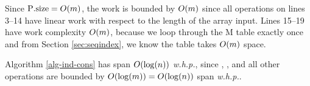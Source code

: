 Since $\text{P}.\text{size} = O(m)$, the work is bounded by $O(m)$ since all operations on lines 3--14 have linear work with respect to the length of the array input. Lines 15--19 have work complexity $O(m)$, because we loop through the $\text{M}$ table exactly once and from Section \ref{sec:seqindex}, we know the table takes $O(m)$ space.

Algorithm \ref{alg-ind-cons} has span $O(\log(n))$ \textit{w.h.p.}, since , , and all other operations are bounded by $O(\log(m)) = O(\log(n))$ span \textit{w.h.p.}. 



 
